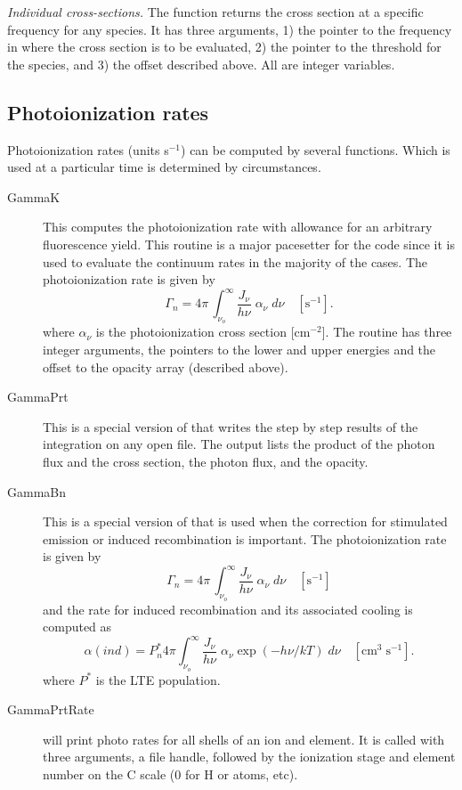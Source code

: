 \emph{Individual cross-sections.}  The function 
returns the cross section
at a specific frequency for any species.
It has three arguments, 1) the
pointer to the frequency in  where the cross section
is to be evaluated,
2) the pointer to the threshold for the species, and 3) the  offset
described above.
All are integer variables.

\subsection{Photoionization rates}

Photoionization rates (units s$^{-1}$) can be computed by several functions.
Which is used at a particular time is determined by circumstances.
\begin{description}
\item[GammaK]  This computes the photoionization rate with
allowance for an
arbitrary fluorescence yield.
This routine is a major pacesetter for the
code since it is used to evaluate the continuum rates
in the majority of
the cases.
The photoionization rate is given by
\begin{equation}
{\Gamma _n} = 4\pi \,\int_{{\nu _o}}^\infty  {\frac{{{J_\nu }}}{{h\nu
}}\;{\alpha _\nu }\;d\nu }  \quad [\mathrm{s}^{-1}].%
\end{equation}
where $\alpha _\nu$ is the photoionization cross section [cm$^{-2}$].  The routine has three
integer arguments, the  pointers to the lower and upper energies and
the offset to the opacity array  (described above).

\item[GammaPrt]   This is a special version of 
that writes the step by step results of the integration on any open file.  The output lists the
product of the photon flux and the cross section,
the photon flux, and the opacity.

\item[GammaBn]   This is a special version of 
that is used when the
correction for stimulated emission or induced recombination is important.
The photoionization rate is given by
\begin{equation}
{\Gamma _n} = 4\pi \,\int_{{\nu _o}}^\infty  {\frac{{{J_\nu }}}{{h\nu
}}\;{\alpha _\nu }\;d\nu }\quad[\mathrm{s}^{-1}]%
\end{equation}
and the rate for induced recombination and its associated cooling is computed
as
\begin{equation}
\alpha \left( {ind} \right) = P_n^*4\pi \int_{{\nu _o}}^\infty
{\frac{{{J_\nu }}}{{h\nu }}\;{\alpha _\nu }\exp \left( { - h\nu /kT}
\right)\;d\nu } \quad [\mathrm{cm}^3 \; \mathrm{s}^{-1}].%
\end{equation}
where $P^*$ is the LTE population.

\item[GammaPrtRate] will print photo rates for all shells
of an ion and element.
It is called with three arguments, a file handle,
followed by the ionization
stage and element number on the C scale (0 for H or atoms, etc).
\end{description}

